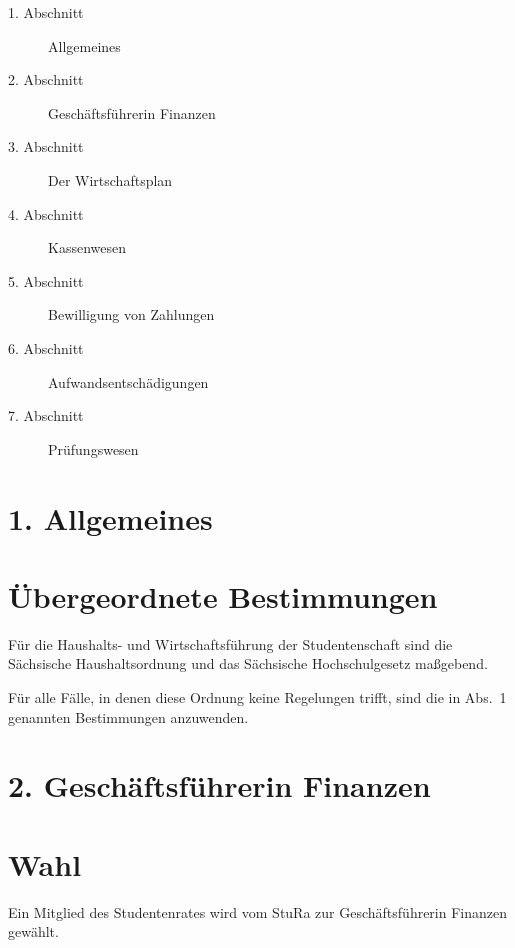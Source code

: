 \setcounter{section}{0}
 
       
        \begin{description}
            \item[1. Abschnitt] Allgemeines
            \item[2. Abschnitt] Geschäftsführerin Finanzen
            \item[3. Abschnitt] Der Wirtschaftsplan
            \item[4. Abschnitt] Kassenwesen
            \item[5. Abschnitt] Bewilligung von Zahlungen
            \item[6. Abschnitt] Aufwandsentschädigungen
            \item[7. Abschnitt] Prüfungswesen
        \end{description}




\section*{1. Allgemeines}

\section{Übergeordnete Bestimmungen}

\Abs \Satz Für die Haushalts- und Wirtschaftsführung der Studentenschaft sind die Sächsische Haushaltsordnung und das Sächsische Hochschulgesetz maßgebend.

\Abs \Satz Für alle Fälle, in denen diese Ordnung keine Regelungen trifft, sind die in Abs.~1 genannten Bestimmungen anzuwenden.


\section*{2. Geschäftsführerin Finanzen}



\section{Wahl}

\Abs \Satz Ein Mitglied des Studentenrates wird vom StuRa zur Geschäftsführerin Finanzen gewählt.

